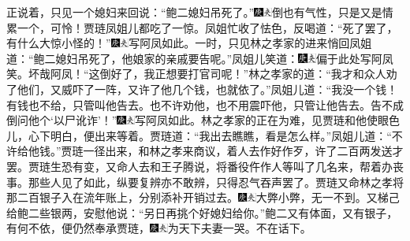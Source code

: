 正说着，只见一个媳妇来回说：``鲍二媳妇吊死了。''{\includegraphics[width=3mm]{../Images/00004}\includegraphics[width=3mm]{../Images/00012}\footnotesize \kaishu 倒也有气性，只是又是情累一个，可怜！}贾琏凤姐儿都吃了一惊。凤姐忙收了怯色，反喝道：``死了罢了，有什么大惊小怪的！''{\includegraphics[width=3mm]{../Images/00004}\includegraphics[width=3mm]{../Images/00012}\footnotesize \kaishu 写阿凤如此。}一时，只见林之孝家的进来悄回凤姐道：``鲍二媳妇吊死了，他娘家的亲戚要告呢。''凤姐儿笑道：{\includegraphics[width=3mm]{../Images/00004}\includegraphics[width=3mm]{../Images/00012}\footnotesize \kaishu 偏于此处写阿凤笑。坏哉阿凤！}``这倒好了，我正想要打官司呢！''林之孝家的道：``我才和众人劝了他们，又威吓了一阵，又许了他几个钱，也就依了。''凤姐儿道：``我没一个钱！有钱也不给，只管叫他告去。也不许劝他，也不用震吓他，只管让他告去。告不成倒问他个`以尸讹诈'！''{\includegraphics[width=3mm]{../Images/00004}\includegraphics[width=3mm]{../Images/00012}\footnotesize \kaishu 写阿凤如此。}林之孝家的正在为难，见贾琏和他使眼色儿，心下明白，便出来等着。贾琏道：``我出去瞧瞧，看是怎么样。''凤姐儿道：``不许给他钱。''贾琏一径出来，和林之孝来商议，着人去作好作歹，许了二百两发送才罢。贾琏生恐有变，又命人去和王子腾说，将番役仵作人等叫了几名来，帮着办丧事。那些人见了如此，纵要复辨亦不敢辨，只得忍气吞声罢了。贾琏又命林之孝将那二百银子入在流年账上，分别添补开销过去。{\includegraphics[width=3mm]{../Images/00004}\includegraphics[width=3mm]{../Images/00012}\footnotesize \kaishu 大弊小弊，无一不到。}又梯己给鲍二些银两，安慰他说：``另日再挑个好媳妇给你。''鲍二又有体面，又有银子，有何不依，便仍然奉承贾琏，{\includegraphics[width=3mm]{../Images/00004}\includegraphics[width=3mm]{../Images/00012}\footnotesize \kaishu 为天下夫妻一哭。}不在话下。

